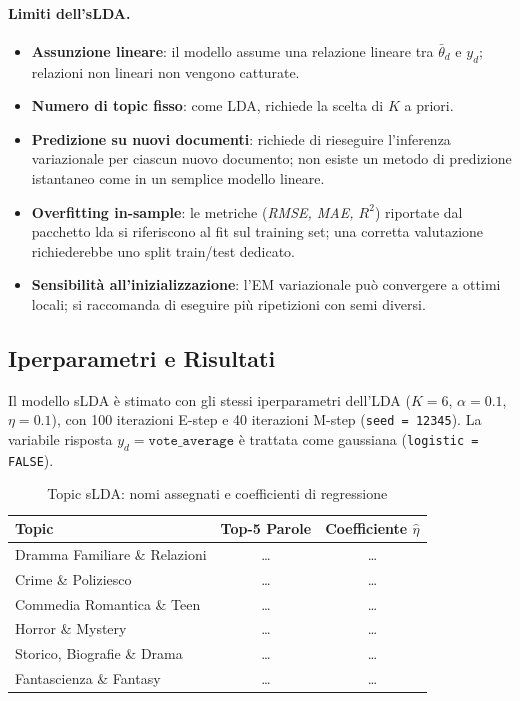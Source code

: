 \documentclass[12pt, a4paper]{article}
\newcommand{\code}[1]{\texttt{#1}}
\newcommand{\pkg}[1]{\textsf{#1}}
\begin{document}
\paragraph{Limiti dell'sLDA.}
\begin{itemize}[leftmargin=1.8em]
  \item \textbf{Assunzione lineare}: il modello assume una
        relazione lineare tra $\bar{\theta}_d$ e $y_d$;
        relazioni non lineari non vengono catturate.
  \item \textbf{Numero di topic fisso}: come LDA, richiede la
        scelta di $K$ a priori.
  \item \textbf{Predizione su nuovi documenti}: richiede di
        rieseguire l'inferenza variazionale per ciascun nuovo
        documento; non esiste un metodo di predizione istantaneo
        come in un semplice modello lineare.
  \item \textbf{Overfitting in-sample}: le metriche
        (\emph{RMSE, MAE, $R^2$}) riportate dal pacchetto
        \pkg{lda} si riferiscono al fit sul training set;
        una corretta valutazione richiederebbe uno split
        train/test dedicato.
  \item \textbf{Sensibilità all'inizializzazione}: l'EM
        variazionale può convergere a ottimi locali; si
        raccomanda di eseguire più ripetizioni con semi diversi.
\end{itemize}

\subsection{Iperparametri e Risultati}

Il modello sLDA è stimato con gli stessi iperparametri dell'LDA
($K=6$, $\alpha=0.1$, $\eta=0.1$), con 100 iterazioni E-step
e 40 iterazioni M-step (\code{seed = 12345}).
La variabile risposta $y_d = \code{vote\_average}$ è trattata
come gaussiana (\code{logistic = FALSE}).

\begin{table}[H]
\centering
\caption{Topic sLDA: nomi assegnati e coefficienti di regressione}
\smallskip
\begin{tabular}{@{}lcc@{}}
\toprule
\textbf{Topic} & \textbf{Top-5 Parole} & \textbf{Coefficiente $\hat{\eta}$} \\
\midrule
Dramma Familiare \& Relazioni   & \ldots & \ldots \\
Crime \& Poliziesco             & \ldots & \ldots \\
Commedia Romantica \& Teen      & \ldots & \ldots \\
Horror \& Mystery               & \ldots & \ldots \\
Storico, Biografie \& Drama     & \ldots & \ldots \\
Fantascienza \& Fantasy         & \ldots & \ldots \\
\bottomrule
\end{tabular}
\end{table}
\end{document}
